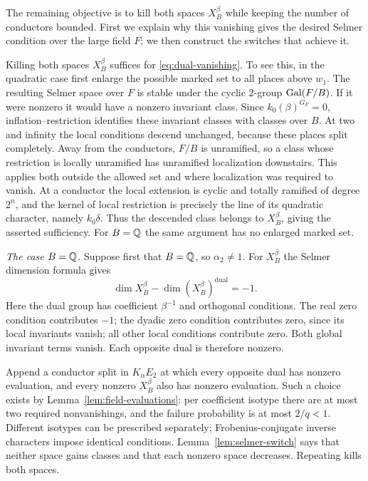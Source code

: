 The remaining objective is to kill both spaces $X_B^\beta$ while
keeping the number of conductors bounded.  First we explain why this
vanishing gives the desired Selmer condition over the large field $F$;
we then construct the switches that achieve it.

Killing both spaces $X_B^\beta$ suffices for
\eqref{eq:dual-vanishing}.  To see this, in the quadratic case first
enlarge the possible marked set to all places above $w_1$.
The resulting Selmer space over $F$ is stable under the cyclic
$2$-group $\operatorname{Gal}(F/B)$.  If it were nonzero it would have a nonzero
invariant class.  Since $k_0(\beta)^{G_F}=0$,
inflation--restriction identifies these invariant classes with
classes over $B$.  At two and infinity the local conditions descend
unchanged, because these places split completely.  Away from the
conductors, $F/B$ is unramified, so a class whose restriction is
locally unramified has unramified localization downstairs.  This
applies both outside the allowed set and where localization was
required to vanish.  At a conductor
the local extension is cyclic and totally ramified of degree $2^n$,
and the kernel of local restriction is precisely the line of its
quadratic character, namely $k_0\delta$.  Thus the descended class
belongs to $X_B^\beta$, giving the asserted sufficiency.  For
$B=\mathbb Q$ the same argument has no enlarged marked set.

\smallskip
\noindent\emph{The case $B=\mathbb Q$.}
Suppose first that $B=\mathbb Q$, so $\alpha_2\ne1$.  For $X_B^\beta$
the Selmer dimension formula gives
\begin{equation}\label{eq:q-selmer-difference}
      \dim X_B^\beta-\dim (X_B^\beta)^{\mathrm{dual}}=-1.
\end{equation}
Here the dual group has coefficient $\beta^{-1}$ and orthogonal
conditions.  The real zero condition contributes $-1$; the dyadic
zero condition contributes zero, since its local invariants vanish;
all other local conditions contribute zero.  Both global invariant
terms vanish.  Each opposite dual is therefore nonzero.

Append a conductor split in $K_\alpha E_2$ at which every opposite
dual has nonzero evaluation, and every nonzero $X_B^\beta$ also has
nonzero evaluation.  Such a choice exists by
Lemma~\ref{lem:field-evaluations}: per coefficient isotype there
are at most two required nonvanishings, and the failure probability
is at most $2/q<1$.  Different isotypes can be prescribed separately;
Frobenius-conjugate inverse characters impose identical conditions.
Lemma~\ref{lem:selmer-switch} says that neither space gains classes
and that each nonzero space decreases.  Repeating kills both spaces.


